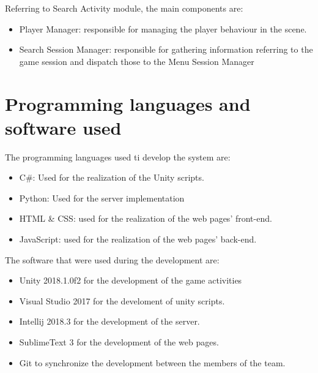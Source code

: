  	Referring to Search Activity module, the main components are:
 	\begin{itemize}
 		\item {Player Manager:} responsible for managing the player behaviour in the scene.
 		\item {Search Session Manager:} responsible for gathering information referring to the game session and dispatch those to the Menu Session Manager
 	\end{itemize}
 
	\section{Programming languages and software used}
	The programming languages used ti develop the system are:
	\begin{itemize}
		\item C\#: Used for the realization of the Unity scripts.
		\item Python: Used for the server implementation
		\item HTML \& CSS: used for the realization of the web pages’ front-end.
		\item JavaScript: used for the realization of the web pages’ back-end.
	\end{itemize}
	\noindent
	The software that were used during the development are:
	\begin{itemize}
		\item Unity 2018.1.0f2 for the development of the game activities
		\item Visual Studio 2017 for the develoment of unity scripts.
		\item Intellij 2018.3 for the development of the server.
		\item SublimeText 3 for the development of the web pages.
		\item Git to synchronize the development between the members of the team.
	\end{itemize}
	
	
 	
	
	
	
	
		
		
		 
	
	
	
	
	

